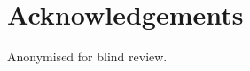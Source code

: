 \documentclass{article}
\begin{document}

\section*{Acknowledgements}

Anonymised for blind review.




\end{document}
